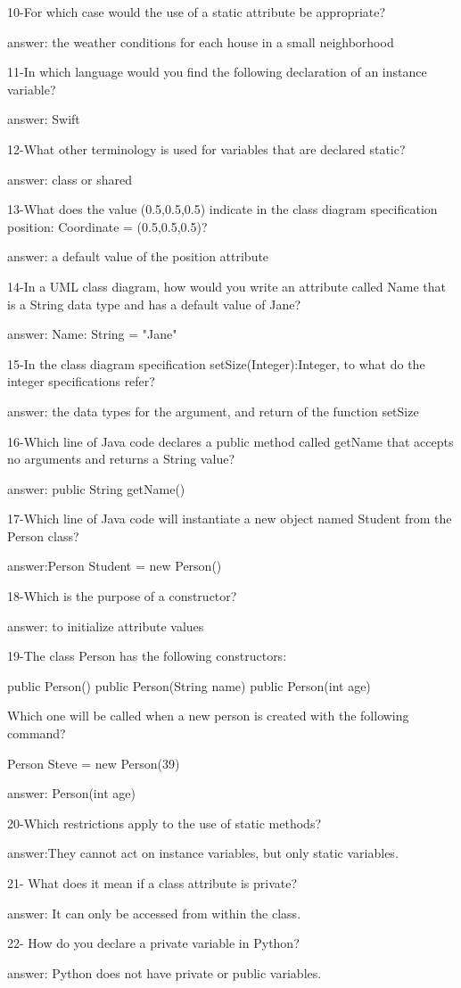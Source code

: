 10-For which case would the use of a static attribute be appropriate?


answer: the weather conditions for each house in a small neighborhood

11-In which language would you find the following declaration of an instance variable?

answer: Swift

12-What other terminology is used for variables that are declared static?


answer: class or shared

13-What does the value (0.5,0.5,0.5) indicate in the class diagram specification position: Coordinate = (0.5,0.5,0.5)?


answer: a default value of the position attribute

14-In a UML class diagram, how would you write an attribute called Name that is a String data type and has a default value of Jane?


answer: Name: String = "Jane"

15-In the class diagram specification setSize(Integer):Integer, to what do the integer specifications refer?


answer: the data types for the argument, and return of the function setSize

16-Which line of Java code declares a public method called getName that accepts no arguments and returns a String value?


answer: public String getName()

17-Which line of Java code will instantiate a new object named Student from the Person class?


answer:Person Student = new Person()

18-Which is the purpose of a constructor?


answer: to initialize attribute values

19-The class Person has the following constructors:

public Person()
public Person(String name)
public Person(int age)

Which one will be called when a new person is created with the following command?

Person Steve = new Person(39)

answer: Person(int age)

20-Which restrictions apply to the use of static methods?

answer:They cannot act on instance variables, but only static variables.

21- What does it mean if a class attribute is private?

answer: It can only be accessed from within the class.

22- How do you declare a private variable in Python?

answer: Python does not have private or public variables.
